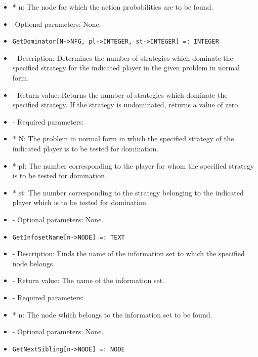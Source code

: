 \begin{itemize}
\bd
\item
*  n:  The node for which the action probabilities are to be found.
\ed

\item
-Optional parameters:  None.
\ed

\item
\begin{verbatim}
GetDominator[N->NFG, pl->INTEGER, st->INTEGER] =: INTEGER
\end{verbatim}

\bd
\item
- Description:  Determines the number of strategies which dominate the
specified strategy for the indicated player in the given problem in 
normal form.
\item
- Return value:  Returns the number of strategies which dominate the
specified strategy.  If the strategy is undominated, returns a value
of zero.  
\item
- Required parameters:

\bd
\item
*  N:  The problem in normal form in which the specified strategy of
the indicated player is to be tested for domination.
\item
*  pl:  The number corresponding to the player for whom the specified
strategy is to be tested for domination.
\item
*  st:  The number corresponding to the strategy belonging to the 
indicated player which is to be tested for domination.
\ed

\item
- Optional parameters:  None.
\ed

\item
\begin{verbatim}
GetInfosetName[n->NODE] =: TEXT
\end{verbatim}

\bd
\item
- Description:  Finds the name of the information set to which the 
specified node belongs.
\item
- Return value:  The name of the information set.
\item
- Required parameters:

\bd
\item
*  n:  The node which belongs to the information set to be found.
\ed

\item
- Optional parameters:  None.
\ed

\item
\begin{verbatim}
GetNextSibling[n->NODE] =: NODE
\end{verbatim}


\end{itemize}
